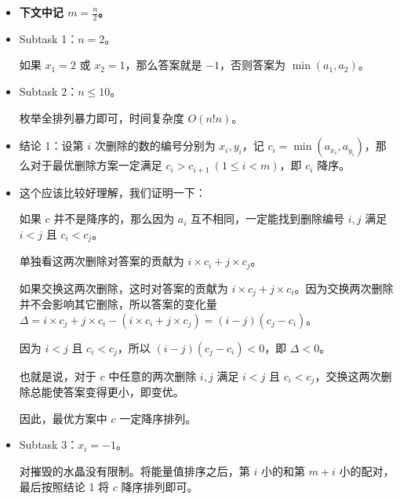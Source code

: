 \documentclass[10pt,aspectratio=43,mathserif]{beamer}
\begin{document}
\begin{frame}

	\begin{itemize} \setlength{\parskip}{0.4\baselineskip}

		\item \textbf{下文中记 $m=\frac{n}{2}$。}

		\item Subtask 1：$n=2$。

		如果 $x_1=2$ 或 $x_2=1$，那么答案就是 $-1$，否则答案为 $\min(a_1,a_2)$。

		\item Subtask 2：$n\leq 10$。

		枚举全排列暴力即可，时间复杂度 $O(n!n)$。

	\end{itemize}

\end{frame}

\begin{frame}

	\begin{itemize} \setlength{\parskip}{0.2\baselineskip}

		\item 结论 1：设第 $i$ 次删除的数的编号分别为 $x_i,y_i$，记 $c_i=\min(a_{x_i},a_{y_i})$，那么对于最优删除方案一定满足 $c_i>c_{i+1}\ (1\leq i<m)$，即 $c_i$ 降序。

		\item 这个应该比较好理解，我们证明一下：

		如果 $c$ 并不是降序的，那么因为 $a_i$ 互不相同，一定能找到删除编号 $i,j$ 满足 $i<j$  且 $c_i<c_j$。

		单独看这两次删除对答案的贡献为 $i\times c_i+j\times c_j$。

		如果交换这两次删除，这时对答案的贡献为 $i\times c_j+j\times c_i$。因为交换两次删除并不会影响其它删除，所以答案的变化量 $\Delta=i\times c_j+j\times c_i-(i\times c_i+j\times c_j)=(i-j)(c_j-c_i)$。

		因为 $i<j$ 且 $c_i<c_j$，所以 $(i-j)(c_j-c_i)<0$，即 $\Delta<0$。

		也就是说，对于 $c$ 中任意的两次删除 $i,j$ 满足 $i<j$ 且 $c_i<c_j$，交换这两次删除总能使答案变得更小，即变优。

		因此，最优方案中 $c$ 一定降序排列。

		\item Subtask 3：$x_i=-1$。

		对摧毁的水晶没有限制。将能量值排序之后，第 $i$ 小的和第 $m+i$ 小的配对，最后按照结论 1 将 $c$ 降序排列即可。

	\end{itemize}

\end{frame}
\end{document}
